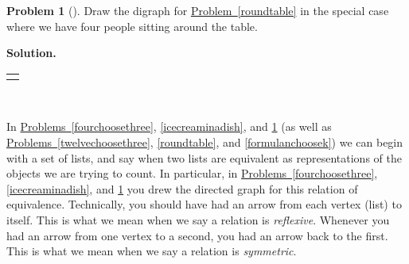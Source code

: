 \documentclass[10pt,]{book}
\theoremstyle{plain}
\theoremstyle{definition}
\newtheorem{activity}[project]{Problem}
\theoremstyle{definition}
\numberwithin{equation}{chapter}
\newlength{\panelmax}
\begin{document}
\begin{activity}[]\label{roundtablefour}
Draw the digraph for \hyperref[roundtable]{Problem~\ref{roundtable}} in the special case where we have four people sitting around the table.%
\par\medskip\noindent%
\textbf{Solution.}\quad %
{%
\setlength{\panelmax}{0pt}
\newsavebox{\panelboxBBimage}
\newlength{\phBBimage}\setlength{\phBBimage}{\ht\panelboxBBimage+\dp\panelboxBBimage}
\settototalheight{\phBBimage}{\usebox{\panelboxBBimage}}
\setlength{\panelmax}{\maxof{\panelmax}{\phBBimage}}
\leavevmode%
\setlength{\tabcolsep}{0\linewidth}
\par\medskip\noindent
\hspace*{0.15\linewidth}%
\begin{tabular}{@{}*{1}{c}@{}}
\begin{minipage}[c][\panelmax][t]{0.7\linewidth}\usebox{\panelboxBBimage}\end{minipage}\end{tabular}\\
}%
\end{activity}
In \hyperref[fourchoosethree]{Problems~\ref{fourchoosethree}}, \hyperref[icecreaminadish]{\ref{icecreaminadish}}, and \hyperref[roundtablefour]{\ref{roundtablefour}} (as well as \hyperref[twelvechoosethree]{Problems~\ref{twelvechoosethree}}, \hyperref[roundtable]{\ref{roundtable}}, and \hyperref[formulanchoosek]{\ref{formulanchoosek}}) we can begin with a set of lists, and say when two lists are equivalent as representations of the objects we are trying to count. In particular, in \hyperref[fourchoosethree]{Problems~\ref{fourchoosethree}}, \hyperref[icecreaminadish]{\ref{icecreaminadish}}, and \hyperref[roundtablefour]{\ref{roundtablefour}} you drew the directed graph for this relation of equivalence. Technically, you should have had an arrow from each vertex (list) to itself. This is what we mean when we say a relation is \emph{reflexive}. Whenever you had an arrow from one vertex to a second, you had an arrow back to the first. This is what we mean when we say a relation is \emph{symmetric}.%
\end{document}
